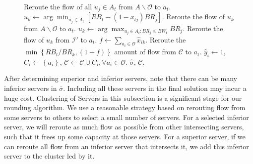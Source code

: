 \documentclass[journal]{IEEEtran}
\begin{document}
\begin{figure}[!t]
\begin{algorithm}[H]
\begin{algorithmic}[1]
			\STATE Reroute the flow of all $u_j\in A_t$ from $A \backslash \mathcal{O}$ to $a_t$. 
			\ENDIF
			\STATE $u_k \leftarrow \arg\min_{u_j \in A_t}\left[RB_t - (1-x_{tj})BR_j\right]$.
			\STATE Reroute the flow of $u_k$ from $A \backslash \mathcal{O}$ to $a_t$.
			\ENDWHILE
			\ENDIF
			\STATE $u_k \leftarrow \arg\max_{u_j \in A_t : BR_j \le BW_t}BR_j$.
			\STATE Reroute the flow of $u_k$ from $\mathcal{I}'$ to $a_t$.
			\STATE $f \leftarrow \sum\nolimits_{{a_i} \in \mathcal{O}} {{{\widehat x}_{ik}}} $.
			\STATE Reroute the $\min \left\{RB_t/BR_k, (1-f)\right\}$ amount of flow from $\mathcal{C}$ to $a_t$.
			\ENDIF
			\ENDIF
			\ENDWHILE
			\STATE $\widehat y_i \leftarrow 1$, $ C_i \leftarrow \left\{a_i\right\} $, $\mathcal{C} \leftarrow \mathcal{C} \cup C_i , \forall a_i \in \mathcal{O}$. 
			\RETURN $\widehat{\sigma}$, $\mathcal{C}$.
		\end{algorithmic}
	\end{algorithm}
\end{figure}
After determining superior and inferior servers, note that there can be many inferior servers in $\overline{\sigma}$.  Including all these servers in the final solution may incur a huge cost. Clustering of Servers in this subsection is a significant stage for our rounding algorithm. We use a reasonable strategy based on rerouting flow from some servers to others to select a small number of servers. For a selected inferior server, we will reroute as much flow as possible from other intersecting servers, such that it frees up some capacity at those servers. For a superior server, if we can reroute all flow from an inferior server that intersects it, we add this inferior server to the cluster led by it. 
\end{document}
